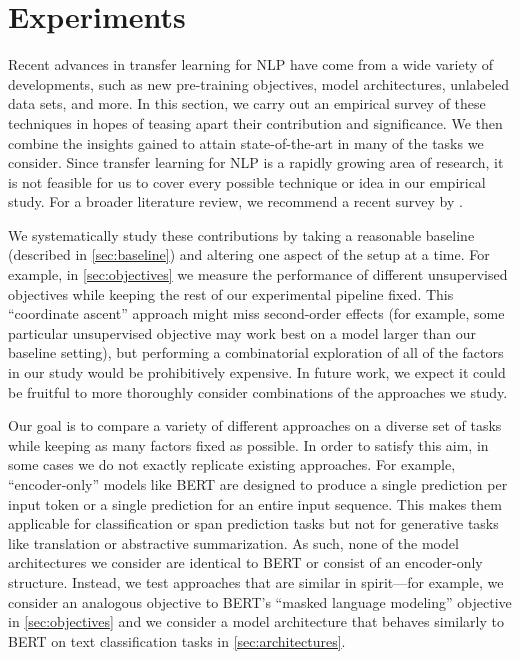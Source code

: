 \documentclass[twoside,11pt]{article}
\begin{document}
\section{Experiments}
\label{sec:experiments}

Recent advances in transfer learning for NLP have come from a wide variety of developments, such as new pre-training objectives, model architectures, unlabeled data sets, and more.
In this section, we carry out an empirical survey of these techniques in hopes of teasing apart their contribution and significance.
We then combine the insights gained to attain state-of-the-art in many of the tasks we consider.
Since transfer learning for NLP is a rapidly growing area of research, it is not feasible for us to cover every possible technique or idea in our empirical study.
For a broader literature review, we recommend a recent survey by \cite{ruder2019transfer}.

We systematically study these contributions by taking a reasonable baseline (described in \cref{sec:baseline}) and altering one aspect of the setup at a time.
For example, in \cref{sec:objectives} we measure the performance of different unsupervised objectives while keeping the rest of our experimental pipeline fixed.
This ``coordinate ascent'' approach might miss second-order effects (for example, some particular unsupervised objective may work best on a model larger than our baseline setting), but performing a combinatorial exploration of all of the factors in our study would be prohibitively expensive.
In future work, we expect it could be fruitful to more thoroughly consider combinations of the approaches we study.

Our goal is to compare a variety of different approaches on a diverse set of tasks while keeping as many factors fixed as possible.
In order to satisfy this aim, in some cases we do not exactly replicate existing approaches.
For example, ``encoder-only'' models like BERT \citep{devlin2018bert} are designed to produce a single prediction per input token or a single prediction for an entire input sequence.
This makes them applicable for classification or span prediction tasks but not for generative tasks like translation or abstractive summarization.
As such, none of the model architectures we consider are identical to BERT or consist of an encoder-only structure.
Instead, we test approaches that are similar in spirit---for example, we consider an analogous objective to BERT's ``masked language modeling'' objective in \cref{sec:objectives} and we consider a model architecture that behaves similarly to BERT on text classification tasks in \cref{sec:architectures}.
\end{document}
